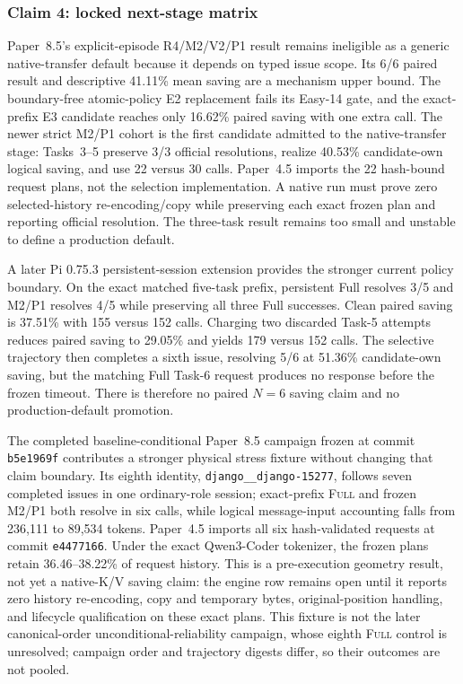 \documentclass[11pt]{article}
\begin{document}
\subsubsection{Claim 4: locked next-stage matrix}

Paper~8.5's explicit-episode R4/M2/V2/P1 result remains ineligible as a generic
native-transfer default because it depends on typed issue scope.  Its 6/6
paired result and descriptive 41.11\% mean saving are a mechanism upper bound.
The boundary-free atomic-policy E2 replacement fails its Easy-14 gate, and the
exact-prefix E3 candidate reaches only 16.62\% paired saving with one extra
call.  The newer strict M2/P1 cohort is the first candidate admitted to the
native-transfer stage: Tasks~3--5 preserve 3/3 official resolutions, realize
40.53\% candidate-own logical saving, and use 22 versus 30 calls.  Paper~4.5
imports the 22 hash-bound request plans, not the selection implementation.  A
native run must prove zero selected-history re-encoding/copy while preserving
each exact frozen plan and reporting official resolution.  The three-task
result remains too small and unstable to define a production default.

A later Pi 0.75.3 persistent-session extension provides the stronger current
policy boundary.  On the exact matched five-task prefix, persistent Full
resolves 3/5 and M2/P1 resolves 4/5 while preserving all three Full successes.
Clean paired saving is 37.51\% with 155 versus 152 calls.  Charging two
discarded Task-5 attempts reduces paired saving to 29.05\% and yields 179
versus 152 calls.  The selective trajectory then completes a sixth issue,
resolving 5/6 at 51.36\% candidate-own saving, but the matching Full Task-6
request produces no response before the frozen timeout.  There is therefore no
paired $N=6$ saving claim and no production-default promotion.

The completed baseline-conditional Paper~8.5 campaign frozen at commit
\texttt{b5e1969f} contributes a stronger physical stress fixture without
changing that claim boundary.  Its eighth identity,
\texttt{django\_\_django-15277}, follows seven completed issues in one
ordinary-role session; exact-prefix \textsc{Full} and frozen M2/P1 both resolve
in six calls, while logical message-input accounting falls from 236,111 to
89,534 tokens.  Paper~4.5 imports all six hash-validated requests at commit
\texttt{e4477166}.  Under the exact Qwen3-Coder tokenizer, the frozen plans
retain 36.46--38.22\% of request history.  This is a pre-execution geometry
result, not yet a native-K/V saving claim: the engine row remains open until it
reports zero history re-encoding, copy and temporary bytes, original-position
handling, and lifecycle qualification on these exact plans.
This fixture is not the later canonical-order unconditional-reliability
campaign, whose eighth \textsc{Full} control is unresolved; campaign order and
trajectory digests differ, so their outcomes are not pooled.
\end{document}
